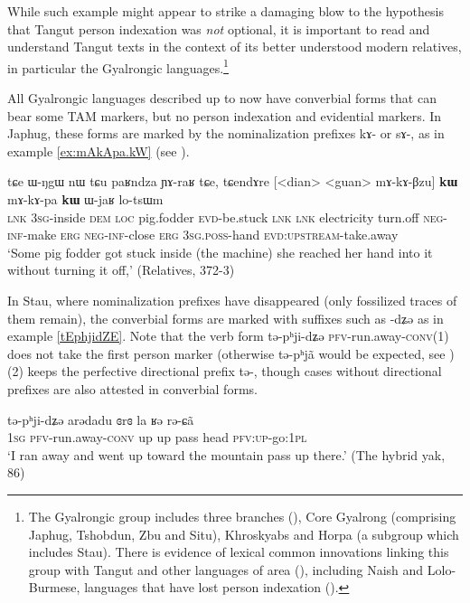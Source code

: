 \documentclass[oldfontcommands,oneside,a4paper,11pt]{article}
\newcommand{\ipa}[1]{{\phon \mbox{#1}}} %
\begin{document}
While such example might appear to strike a damaging blow to the hypothesis that Tangut person indexation was \textit{not} optional, it is important to read and understand Tangut texts in the context of its better understood modern relatives, in particular the Gyalrongic languages.\footnote{The Gyalrongic group includes three branches (\citealt{jackson00sidaba, jackson00puxi}), Core Gyalrong (comprising Japhug, Tshobdun, Zbu and Situ), Khroskyabs and Horpa (a subgroup which includes Stau). There is evidence of lexical common innovations linking this group with Tangut and other languages of area (\citealt{jacques14esquisse}), including Naish and Lolo-Burmese, languages that have lost person indexation (\citealt{jacques.michaud11naish}).}

All Gyalrongic languages described up to now have converbial forms that can bear some TAM markers, but no person indexation and evidential markers. In Japhug, these forms are   marked by the nominalization prefixes \ipa{kɤ-} or \ipa{sɤ-}, as in example \ref{ex:mAkApa.kW} (see \citealt{jacques14linking}).

\begin{exe}
\ex \label{ex:mAkApa.kW}
\gll
\ipa{tɕe}   	\ipa{ɯ-ŋgɯ}   	\ipa{nɯ} \ipa{tɕu}   	\ipa{paʁndza}   	\ipa{ɲɤ-raʁ}   	\ipa{tɕe,}   	\ipa{tɕendɤre}   	[<dian>   	<guan>   	\ipa{mɤ-kɤ-βzu}] 	\ipa{\textbf{kɯ}}   	\ipa{mɤ-kɤ-pa}   	\ipa{\textbf{kɯ}}   	\ipa{ɯ-jaʁ}   	\ipa{lo-tsɯm}   \\
\textsc{lnk} \textsc{3sg}-inside \textsc{dem} \textsc{loc} pig.fodder \textsc{evd}-be.stuck \textsc{lnk}
\textsc{lnk} electricity turn.off \textsc{neg-inf}-make \textsc{erg}  \textsc{neg-inf}-close \textsc{erg}  \textsc{3sg.poss}-hand \textsc{evd:upstream}-take.away \\
\glt `Some pig fodder got stuck inside (the machine) she reached her hand into it without turning it off,' (Relatives, 372-3)
\end{exe} 

In Stau, where nominalization prefixes have disappeared (only  fossilized traces of them remain), the converbial forms are marked with suffixes such as \ipa{-dʑə} as in example \ref{tEphjidZE}. Note that the verb form \ipa{tə-pʰji-dʑə} \textsc{pfv}-run.away-\textsc{conv}(1) does not take the first person marker (otherwise \ipa{tə-pʰjã} would be expected, see \citealt{jacques14rtau}) (2) keeps the perfective directional prefix \ipa{tə-}, though cases without directional prefixes are also attested in converbial forms.

\begin{exe}
\ex \label{tEphjidZE}
\gll \ipa{ŋa} 	\ipa{tə-pʰji-dʑə} 	\ipa{arədadu} 	\ipa{ɞrɞ} 	\ipa{la} 	\ipa{ʁə} 	\ipa{rə-ɕã} \\
 \textsc{1sg} \textsc{pfv}-run.away-\textsc{conv} up up pass head \textsc{pfv:up}-go:\textsc{1pl} \\
\glt `I ran away and went up toward the mountain pass up there.' (The hybrid yak, 86) 
\end{exe}
\end{document}
